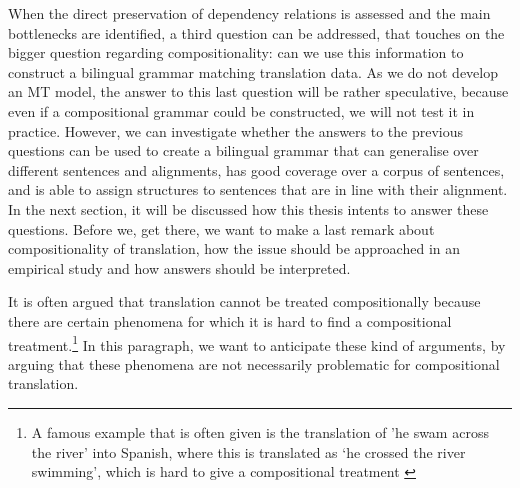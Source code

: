 When the direct preservation of dependency relations is assessed and the main bottlenecks are identified, a third question can be addressed, that touches on the bigger question regarding compositionality: can we use this information to construct a bilingual grammar matching translation data. As we do not develop an MT model, the answer to this last question will be rather speculative, because even if a compositional grammar could be constructed, we will not test it in practice. However, we can investigate whether the answers to the previous questions can be used to create a bilingual grammar that can generalise over different sentences and alignments, has good coverage over a corpus of sentences, and is able to assign structures to sentences that are in line with their alignment.\\

In the next section, it will be discussed how this thesis intents to answer these questions. Before we, get there, we want to make a last remark about compositionality of translation, how the issue should be approached in an empirical study and how answers should be interpreted.

It is often argued that translation cannot be treated compositionally because there are certain phenomena for which it is hard to find a compositional treatment.\footnote{A famous example that is often given is the translation of 'he swam across the river' into Spanish, where this is translated as `he crossed the river swimming', which is hard to give a compositional treatment \citep{landsbergen1989power}} In this paragraph, we want to anticipate these kind of arguments, by arguing that these phenomena are not necessarily problematic for compositional translation.

